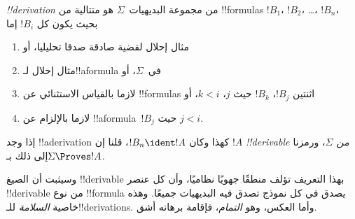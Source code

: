 \documentclass[../../../include/open-logic-section]{subfiles}
\begin{document}
\begin{defn}
\emph{!!{derivation}} من مجموعة البديهيات~$\Sigma$ هو متتالية من
!!{formula}s $!B_1$، $!B_2$، \dots، $!B_n$، بحيث يكون كل $!B_i$ إما
\begin{enumerate}
\item مثال إحلال لقضية صادقة صدقا تحليليا، أو
\item مثال إحلال لـ!!a{formula} في~$\Sigma$، أو
\item لازما بالقياس الاستثنائي عن !!{formula}s اثنتين $!B_j$، $!B_k$
  حيث $j$، $k < i$، أو
\item لازما بالإلزام عن !!a{formula}~$!B_j$ حيث $j < i$.
\end{enumerate}
إذا وجد !!a{derivation} كهذا وكان $!B_n \ident !A$، قلنا إن
$!A$ \emph{!!{derivable} من $\Sigma$}، ورمزنا إلى ذلك بـ$\Sigma \Proves !A$.
\end{defn}

وسيثبت أن الصيغ !!{derivable} بهذا التعريف تؤلف منطقًا جهويًا
نظاميًا، وأن كل عنصر !!{derivable} من نوع !!{formula} يصدق
في كل نموذج تصدق فيه البديهيات جميعًا. وهذه خاصية
\emph{السلامة} للـ!!{derivation}s. وأما العكس، وهو
\emph{التمام}، فإقامة برهانه أشق.
\end{document}
